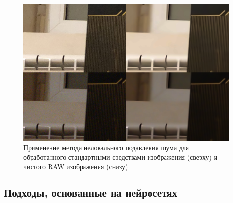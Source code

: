\begin{figure}[h]
	\centering
	\includegraphics[width=\textwidth]{img/nlmdenoising_comparison}
	\caption{Применение метода нелокального подавления шума для обработанного стандартными средствами изображения (сверху) и чистого RAW изображения (снизу)}
	\label{fig:nlmdenoising_comparison}
\end{figure}

\subsection{Подходы, основанные на нейросетях}

\printbibliography[%
    heading=bibintoc%
]


